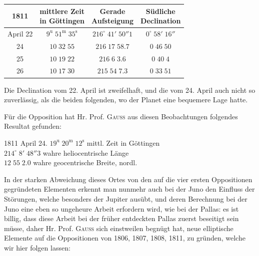 \begin{center}\fontsize{10}{12}\selectfont\setlength{\tabcolsep}{4pt}\renewcommand{\arraystretch}{1.15}\begin{tabular}{c|c|c|c}
1811 & \shortstack{mittlere Zeit\\in Göttingen} & \shortstack{Gerade\\Aufsteigung} & \shortstack{Südliche\\Declination}\\\hline
April 22 & $9^{\text{u}}\;51^{\text{m}}\;35^{\text{s}}$ & $216^\circ\;41'\;50''1$ & $0^\circ\;58'\;16''$\\
24 & $10\;32\;55$ & $216\;17\;58.7$ & $0\;46\;50$\\
25 & $10\;19\;22$ & $216\;6\;3.6$ & $0\;40\;4$\\
26 & $10\;17\;30$ & $215\;54\;7.3$ & $0\;33\;51$\\
\end{tabular}\end{center}

\par\indent Die Declination vom 22. April ist zweifelhaft, und die vom 24. April auch nicht so zuverlässig, als die beiden folgenden, wo der Planet eine bequemere Lage hatte.

\par\indent Für die Opposition hat Hr. Prof. \textsc{Gauss} aus diesen Beobachtungen folgendes Resultat gefunden:
\begin{center}1811 April 24. $19^{\text{u}}\;20^{\text{m}}\;12^{\text{s}}$ mittl. Zeit in Göttingen\\$214^\circ\;8'\;48''3$ wahre heliocentrische Länge\\$12\;55\;2.0$ wahre geocentrische Breite, nordl.\end{center}
\par\indent In der starken Abweichung dieses Ortes von den auf die vier ersten Oppositionen gegründeten Elementen erkennt man nunmehr auch bei der Juno den Einfluss der Störungen, welche besonders der Jupiter ausübt, und deren Berechnung bei der Juno eine eben so ungeheure Arbeit erfordern wird, wie bei der Pallas: es ist billig, dass diese Arbeit bei der früher entdeckten Pallas zuerst beseitigt sein müsse, daher Hr. Prof. \textsc{Gauss} sich einstweilen begnügt hat, neue elliptische Elemente auf die Oppositionen von 1806, 1807, 1808, 1811, zu gründen, welche wir hier folgen lassen:

